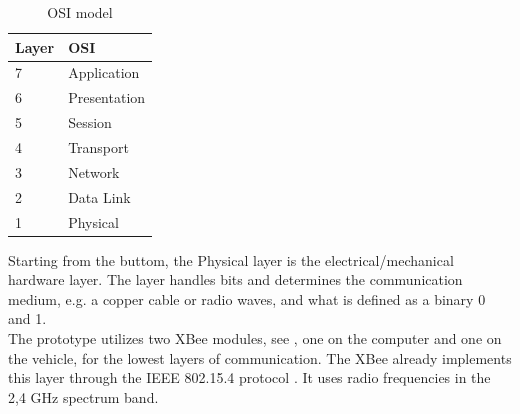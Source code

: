 \begin{table}[H]\centering
\begin{tabular}{|p{1.5cm}|p{3cm}|}
\hline%
  \textbf{Layer} & \textbf{OSI} \\
\hline%
    7 &    Application      \\
\hline%
    6 &    Presentation      \\
\hline%
    5 &    Session       \\
\hline%
    4 &    Transport    \\
\hline%
    3 &   Network     \\
\hline%
    2 &   Data Link     \\
\hline%
    1 &    Physical     \\
\hline%
\end{tabular}
\caption{OSI model}
\label{tab:OSIModel}
\end{table}\vspace{-5mm}
Starting from the buttom, the Physical layer is the electrical/mechanical hardware layer. The layer handles bits and determines the communication medium, e.g. a copper cable or radio waves, and what is defined as a binary 0 and 1.\\The prototype utilizes two XBee modules, see , one on the computer and one on the vehicle, for the lowest layers of communication. The XBee already implements this layer through the IEEE 802.15.4 protocol \cite{Xbee,IEEE812154}. It uses radio frequencies in the 2,4 \si{GHz} spectrum band.

